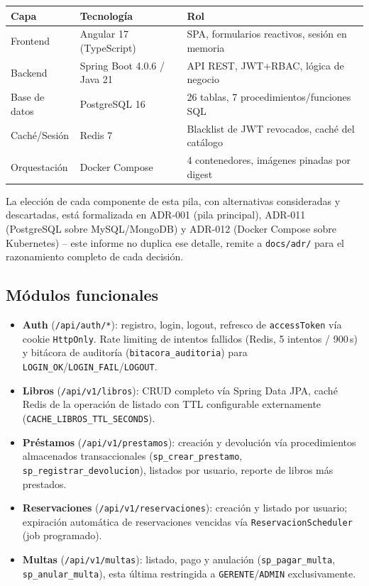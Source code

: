 \documentclass[12pt,a4paper]{article}
\begin{document}
\begin{center}
\begin{tabular}{|l|l|l|}
\hline
\rowcolor{verdeuteq}
\color{white}\textbf{Capa} & \color{white}\textbf{Tecnología} & \color{white}\textbf{Rol} \\
\hline
Frontend & Angular 17 (TypeScript) & SPA, formularios reactivos, sesión en memoria \\
\hline
Backend & Spring Boot 4.0.6 / Java 21 & API REST, JWT+RBAC, lógica de negocio \\
\hline
Base de datos & PostgreSQL 16 & 26 tablas, 7 procedimientos/funciones SQL \\
\hline
Caché/Sesión & Redis 7 & Blacklist de JWT revocados, caché del catálogo \\
\hline
Orquestación & Docker Compose & 4 contenedores, imágenes pinadas por digest \\
\hline
\end{tabular}
\end{center}

La elección de cada componente de esta pila, con alternativas
consideradas y descartadas, está formalizada en ADR-001 (pila principal),
ADR-011 (PostgreSQL sobre MySQL/MongoDB) y ADR-012 (Docker Compose sobre
Kubernetes) -- este informe no duplica ese detalle, remite a
\texttt{docs/adr/} para el razonamiento completo de cada decisión.

\subsection{Módulos funcionales}

\begin{itemize}[leftmargin=1.2cm]
  \item \textbf{Auth} (\texttt{/api/auth/*}): registro, login, logout,
    refresco de \texttt{accessToken} vía cookie \texttt{HttpOnly}.
    Rate limiting de intentos fallidos (Redis, 5 intentos / 900\,s) y
    bitácora de auditoría (\texttt{bitacora\_auditoria}) para
    \texttt{LOGIN\_OK}/\texttt{LOGIN\_FAIL}/\texttt{LOGOUT}.
  \item \textbf{Libros} (\texttt{/api/v1/libros}): CRUD completo vía
    Spring Data JPA, caché Redis de la operación de listado con TTL
    configurable externamente (\texttt{CACHE\_LIBROS\_TTL\_SECONDS}).
  \item \textbf{Préstamos} (\texttt{/api/v1/prestamos}): creación y
    devolución vía procedimientos almacenados transaccionales
    (\texttt{sp\_crear\_prestamo}, \texttt{sp\_registrar\_devolucion}),
    listados por usuario, reporte de libros más prestados.
  \item \textbf{Reservaciones} (\texttt{/api/v1/reservaciones}): creación
    y listado por usuario; expiración automática de reservaciones
    vencidas vía \texttt{ReservacionScheduler} (job programado).
  \item \textbf{Multas} (\texttt{/api/v1/multas}): listado, pago y
    anulación (\texttt{sp\_pagar\_multa}, \texttt{sp\_anular\_multa}),
    esta última restringida a \texttt{GERENTE}/\texttt{ADMIN}
    exclusivamente.
\end{itemize}
\end{document}
